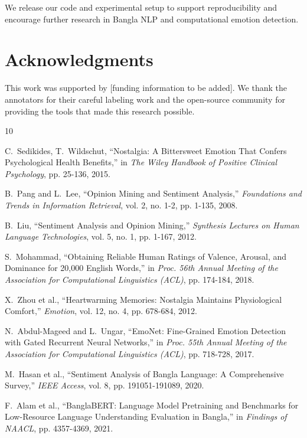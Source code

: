 \documentclass[conference]{IEEEtran}
\begin{document}
We release our code and experimental setup to support reproducibility and encourage further research in Bangla NLP and computational emotion detection.

\section*{Acknowledgments}

This work was supported by [funding information to be added]. We thank the annotators for their careful labeling work and the open-source community for providing the tools that made this research possible.


\begin{thebibliography}{10}

C.~Sedikides, T.~Wildschut, ``Nostalgia: A Bittersweet Emotion That Confers Psychological Health Benefits,'' in \textit{The Wiley Handbook of Positive Clinical Psychology}, pp. 25-136, 2015.

B.~Pang and L.~Lee, ``Opinion Mining and Sentiment Analysis,'' \textit{Foundations and Trends in Information Retrieval}, vol. 2, no. 1-2, pp. 1-135, 2008.

B.~Liu, ``Sentiment Analysis and Opinion Mining,'' \textit{Synthesis Lectures on Human Language Technologies}, vol. 5, no. 1, pp. 1-167, 2012.

S.~Mohammad, ``Obtaining Reliable Human Ratings of Valence, Arousal, and Dominance for 20,000 English Words,'' in \textit{Proc. 56th Annual Meeting of the Association for Computational Linguistics (ACL)}, pp. 174-184, 2018.

X.~Zhou et al., ``Heartwarming Memories: Nostalgia Maintains Physiological Comfort,'' \textit{Emotion}, vol. 12, no. 4, pp. 678-684, 2012.

N.~Abdul-Mageed and L.~Ungar, ``EmoNet: Fine-Grained Emotion Detection with Gated Recurrent Neural Networks,'' in \textit{Proc. 55th Annual Meeting of the Association for Computational Linguistics (ACL)}, pp. 718-728, 2017.

M.~Hasan et al., ``Sentiment Analysis of Bangla Language: A Comprehensive Survey,'' \textit{IEEE Access}, vol. 8, pp. 191051-191089, 2020.

F.~Alam et al., ``BanglaBERT: Language Model Pretraining and Benchmarks for Low-Resource Language Understanding Evaluation in Bangla,'' in \textit{Findings of NAACL}, pp. 4357-4369, 2021.


\end{thebibliography}
\end{document}
